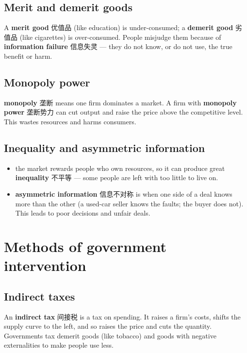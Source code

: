\documentclass[11pt]{article}
\begin{document}
\subsection*{Merit and demerit goods}

A \textbf{merit good} 优值品 (like education) is under-consumed; a \textbf{demerit good} 劣值品 (like cigarettes) is over-consumed. People misjudge them because of \textbf{information failure} 信息失灵 — they do not know, or do not use, the true benefit or harm.

\subsection*{Monopoly power}

\textbf{monopoly} 垄断 means one firm dominates a market. A firm with \textbf{monopoly power} 垄断势力 can cut output and raise the price above the competitive level. This wastes resources and harms consumers.

\subsection*{Inequality and asymmetric information}

\begin{itemize}
\item the market rewards people who own resources, so it can produce great \textbf{inequality} 不平等 — some people are left with too little to live on.

\item \textbf{asymmetric information} 信息不对称 is when one side of a deal knows more than the other (a used-car seller knows the faults; the buyer does not). This leads to poor decisions and unfair deals.

\end{itemize}

\section*{Methods of government intervention}

\subsection*{Indirect taxes}

An \textbf{indirect tax} 间接税 is a tax on spending. It raises a firm's costs, shifts the supply curve to the left, and so raises the price and cuts the quantity. Governments tax demerit goods (like tobacco) and goods with negative externalities to make people use less.
\end{document}
